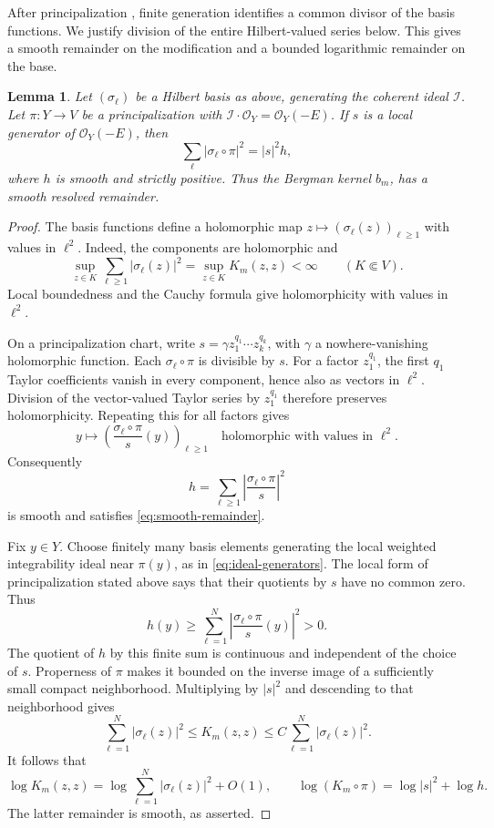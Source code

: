 \documentclass[reqno]{amsart}
\numberwithin{equation}{section}
\newtheorem{lemma}[theorem]{Lemma}
\theoremstyle{definition}
\begin{document}
After principalization \cite[Theorem~1.10]{BM97}, finite
generation identifies a common divisor of the basis functions.
We justify division of the entire Hilbert-valued series below.
This gives a smooth remainder on the modification and a bounded
logarithmic remainder on the base.
\begin{lemma}\label{lem:smooth-remainder}
Let $(\sigma_\ell)$ be a Hilbert basis as above, generating the
coherent ideal $\mathcal I$. Let $\pi:Y\to V$ be a
principalization with
$\mathcal I\cdot\mathcal O_Y=\mathcal O_Y(-E)$.
If $s$ is a local generator of $\mathcal O_Y(-E)$, then
\begin{equation}\label{eq:smooth-remainder}
\sum_\ell|\sigma_\ell\circ\pi|^2=|s|^2h,
\end{equation}
where $h$ is smooth and strictly positive. Thus the  Bergman kernel $b_m$, has a smooth resolved remainder.
\end{lemma}
\begin{proof}
The basis functions define a holomorphic map
$z\mapsto(\sigma_\ell(z))_{\ell\ge1}$ with values in $\ell^2$.
Indeed, the components are holomorphic and
\[
\sup_{z\in K}\sum_{\ell\ge1}|\sigma_\ell(z)|^2
=\sup_{z\in K}K_m(z,z)<\infty
\qquad(K\Subset V).
\]
Local boundedness and the Cauchy formula give holomorphicity
with values in $\ell^2$.

On a principalization chart, write
$s=\gamma z_1^{q_1}\cdots z_k^{q_k}$, with $\gamma$ a
nowhere-vanishing holomorphic function.
Each $\sigma_\ell\circ\pi$ is divisible by $s$.
For a factor $z_1^{q_1}$, the first $q_1$ Taylor
coefficients vanish in every component, hence also as vectors
in $\ell^2$. Division of the vector-valued Taylor series by
$z_1^{q_1}$ therefore preserves holomorphicity. Repeating this
for all factors gives
\[
y\longmapsto
\left(\frac{\sigma_\ell\circ\pi}{s}(y)\right)_{\ell\ge1}
\quad\text{holomorphic with values in }\ell^2.
\]
Consequently
\[
h=\sum_{\ell\ge1}\left|\frac{\sigma_\ell\circ\pi}{s}\right|^2
\]
is smooth and satisfies
\eqref{eq:smooth-remainder}.

Fix $y\in Y$. Choose finitely many basis elements generating
the local weighted integrability ideal near $\pi(y)$, as in
\eqref{eq:ideal-generators}.
The local form of principalization stated above says that
their quotients by $s$ have no common zero. Thus
\[
h(y)\ge\sum_{\ell=1}^N
\left|\frac{\sigma_\ell\circ\pi}{s}(y)\right|^2>0.
\]
The quotient of $h$ by this finite sum is continuous and
independent of the choice of $s$. Properness of $\pi$
makes it bounded on the inverse image of a sufficiently small
compact neighborhood. Multiplying by $|s|^2$ and descending
to that neighborhood gives
\[
\sum_{\ell=1}^N|\sigma_\ell(z)|^2
\le K_m(z,z)\le C\sum_{\ell=1}^N|\sigma_\ell(z)|^2.
\]
It follows that
\[
\log K_m(z,z)
=\log\sum_{\ell=1}^N|\sigma_\ell(z)|^2+O(1),
\qquad
\log(K_m\circ\pi)=\log|s|^2+\log h.
\]
The latter remainder is smooth, as asserted.
\end{proof}
\end{document}
